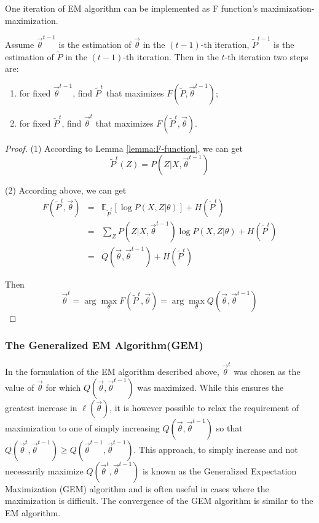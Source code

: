 \begin{theorem}
One iteration of EM algorithm can be implemented as F function's maximization-maximization.

Assume $\vec{\theta}^{t-1}$ is the estimation of $\vec{\theta}$ in the $(t-1)$-th iteration, $\tilde{P}^{t-1}$ is the estimation of $\tilde{P}$ in the $(t-1)$-th iteration. Then in the $t$-th iteration two steps are:
\begin{enumerate}
\item for fixed $\vec{\theta}^{t-1}$, find $\tilde{P}^t$ that maximizes $F(\tilde{P},\vec{\theta}^{t-1})$;
\item for fixed $\tilde{P}^t$, find $\vec{\theta}^t$ that maximizes $F(\tilde{P}^t,\vec{\theta})$.
\end{enumerate}
\end{theorem}

\begin{proof}
(1) According to Lemma \ref{lemma:F-function}, we can get
\begin{equation}
\tilde{P}^t(Z)=P(Z|X, \vec{\theta}^{t-1}) \nonumber
\end{equation}

(2) According above, we can get
\begin{eqnarray}
F(\tilde{P}^t,\vec{\theta}) &=& \mathbb{E}_{\tilde{P}^t}\left[\log{P(X,Z|\theta)}\right]+H(\tilde{P}^t) \nonumber \\
    &=& \sum\limits_Z{P(Z|X,\vec{\theta}^{t-1})\log{P(X,Z|\theta)}}+H(\tilde{P}^t) \nonumber \\
	&=& Q(\vec{\theta}, \vec{\theta}^{t-1})+H(\tilde{P}^t)\nonumber
\end{eqnarray}

Then
\begin{equation}
\vec{\theta}^t=\arg\max\limits_{\theta}F(\tilde{P}^t,\vec{\theta})=\arg\max\limits_{\theta}Q(\vec{\theta}, \vec{\theta}^{t-1}) \nonumber
\end{equation}
\end{proof}


\subsubsection{The Generalized EM Algorithm(GEM)}
In the formulation of the EM algorithm described above, $\vec{\theta}^t$ was chosen as the value of $\vec{\theta}$ for which $Q(\vec{\theta}, \vec{\theta}^{t-1})$ was maximized. While this ensures the greatest increase in $\ell(\vec{\theta})$, it is however possible to relax the requirement of maximization to one of simply increasing $Q(\vec{\theta}, \vec{\theta}^{t-1})$ so that $Q(\vec{\theta}^t, \vec{\theta}^{t-1}) \geq Q(\vec{\theta}^{t-1}, \vec{\theta}^{t-1})$. This approach, to simply increase and not necessarily maximize $Q(\vec{\theta}^t, \vec{\theta}^{t-1})$ is known as the Generalized Expectation Maximization (GEM) algorithm and is often useful in cases where the maximization is difficult. The convergence of the GEM algorithm is similar to the EM algorithm.



